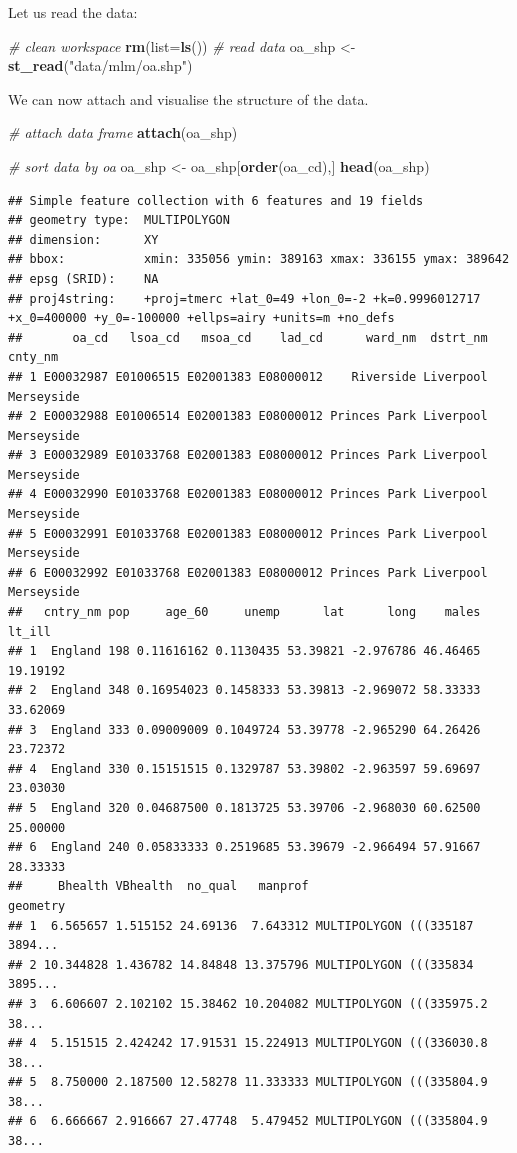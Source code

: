 \documentclass[]{book}
\newenvironment{Shaded}{\begin{snugshade}}{\end{snugshade}}
\newcommand{\KeywordTok}[1]{\textcolor[rgb]{0.13,0.29,0.53}{\textbf{#1}}}
\newcommand{\DataTypeTok}[1]{\textcolor[rgb]{0.13,0.29,0.53}{#1}}
\newcommand{\StringTok}[1]{\textcolor[rgb]{0.31,0.60,0.02}{#1}}
\newcommand{\CommentTok}[1]{\textcolor[rgb]{0.56,0.35,0.01}{\textit{#1}}}
\newcommand{\NormalTok}[1]{#1}
\begin{document}
Let us read the data:

\begin{Shaded}
\begin{Highlighting}[]
\CommentTok{# clean workspace}
\KeywordTok{rm}\NormalTok{(}\DataTypeTok{list=}\KeywordTok{ls}\NormalTok{())}
\CommentTok{# read data}
\NormalTok{oa_shp <-}\StringTok{ }\KeywordTok{st_read}\NormalTok{(}\StringTok{"data/mlm/oa.shp"}\NormalTok{)}
\end{Highlighting}
\end{Shaded}

We can now attach and visualise the structure of the data.

\begin{Shaded}
\begin{Highlighting}[]
\CommentTok{# attach data frame}
\KeywordTok{attach}\NormalTok{(oa_shp)}

\CommentTok{# sort data by oa}
\NormalTok{oa_shp <-}\StringTok{ }\NormalTok{oa_shp[}\KeywordTok{order}\NormalTok{(oa_cd),]}
\KeywordTok{head}\NormalTok{(oa_shp)}
\end{Highlighting}
\end{Shaded}

\begin{verbatim}
## Simple feature collection with 6 features and 19 fields
## geometry type:  MULTIPOLYGON
## dimension:      XY
## bbox:           xmin: 335056 ymin: 389163 xmax: 336155 ymax: 389642
## epsg (SRID):    NA
## proj4string:    +proj=tmerc +lat_0=49 +lon_0=-2 +k=0.9996012717 +x_0=400000 +y_0=-100000 +ellps=airy +units=m +no_defs
##       oa_cd   lsoa_cd   msoa_cd    lad_cd      ward_nm  dstrt_nm    cnty_nm
## 1 E00032987 E01006515 E02001383 E08000012    Riverside Liverpool Merseyside
## 2 E00032988 E01006514 E02001383 E08000012 Princes Park Liverpool Merseyside
## 3 E00032989 E01033768 E02001383 E08000012 Princes Park Liverpool Merseyside
## 4 E00032990 E01033768 E02001383 E08000012 Princes Park Liverpool Merseyside
## 5 E00032991 E01033768 E02001383 E08000012 Princes Park Liverpool Merseyside
## 6 E00032992 E01033768 E02001383 E08000012 Princes Park Liverpool Merseyside
##   cntry_nm pop     age_60     unemp      lat      long    males   lt_ill
## 1  England 198 0.11616162 0.1130435 53.39821 -2.976786 46.46465 19.19192
## 2  England 348 0.16954023 0.1458333 53.39813 -2.969072 58.33333 33.62069
## 3  England 333 0.09009009 0.1049724 53.39778 -2.965290 64.26426 23.72372
## 4  England 330 0.15151515 0.1329787 53.39802 -2.963597 59.69697 23.03030
## 5  England 320 0.04687500 0.1813725 53.39706 -2.968030 60.62500 25.00000
## 6  England 240 0.05833333 0.2519685 53.39679 -2.966494 57.91667 28.33333
##     Bhealth VBhealth  no_qual   manprof                       geometry
## 1  6.565657 1.515152 24.69136  7.643312 MULTIPOLYGON (((335187 3894...
## 2 10.344828 1.436782 14.84848 13.375796 MULTIPOLYGON (((335834 3895...
## 3  6.606607 2.102102 15.38462 10.204082 MULTIPOLYGON (((335975.2 38...
## 4  5.151515 2.424242 17.91531 15.224913 MULTIPOLYGON (((336030.8 38...
## 5  8.750000 2.187500 12.58278 11.333333 MULTIPOLYGON (((335804.9 38...
## 6  6.666667 2.916667 27.47748  5.479452 MULTIPOLYGON (((335804.9 38...
\end{verbatim}
\end{document}
